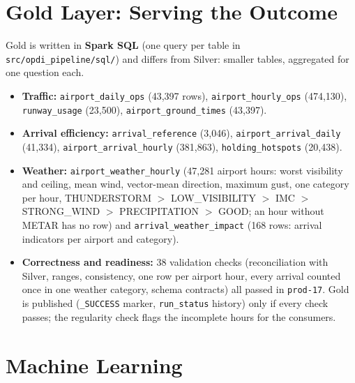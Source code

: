 \documentclass[11pt,a4paper]{article}
\begin{document}
\section{Gold Layer: Serving the Outcome}

Gold is written in \textbf{Spark SQL} (one query per table in \texttt{src/opdi\_pipeline/sql/}) and differs from Silver: smaller tables, aggregated for one question each.
\begin{itemize}[noitemsep,topsep=2pt]
    \item \textbf{Traffic:} \texttt{airport\_daily\_ops} (43,397 rows), \texttt{airport\_hourly\_ops} (474,130), \texttt{runway\_usage} (23,500), \texttt{airport\_ground\_times} (43,397).
    \item \textbf{Arrival efficiency:} \texttt{arrival\_reference} (3,046), \texttt{airport\_arrival\_daily} (41,334), \texttt{airport\_arrival\_hourly} (381,863), \texttt{holding\_hotspots} (20,438).
    \item \textbf{Weather:} \texttt{airport\_weather\_hourly} (47,281 airport hours: worst visibility and ceiling, mean wind, vector-mean direction, maximum gust, one category per hour, THUNDERSTORM $>$ LOW\_VISIBILITY $>$ IMC $>$ STRONG\_WIND $>$ PRECIPITATION $>$ GOOD; an hour without METAR has no row) and \texttt{arrival\_weather\_impact} (168 rows: arrival indicators per airport and category).
    \item \textbf{Correctness and readiness:} 38 validation checks (reconciliation with Silver, ranges, consistency, one row per airport hour, every arrival counted once in one weather category, schema contracts) all passed in \texttt{prod-17}. Gold is published (\texttt{\_SUCCESS} marker, \texttt{run\_status} history) only if every check passes; the regularity check flags the incomplete hours for the consumers.
\end{itemize}

\section{Machine Learning}
\end{document}
